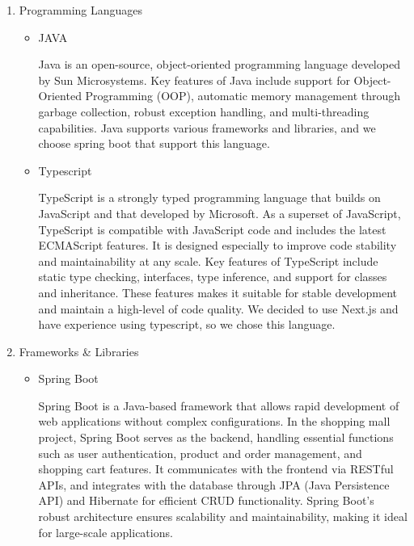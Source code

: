 \documentclass[conference]{IEEEtran}
\begin{document}
\begin{enumerate}
\setlength{\parindent}{2ex}
\setlength{\parskip}{0.5em}
\item Programming Languages

\begin{itemize}
\setlength{\parindent}{2ex}
\setlength{\parskip}{0.5em}
\item JAVA

Java is an open-source, object-oriented programming language developed by Sun Microsystems. Key features of Java include support for Object-Oriented Programming (OOP), automatic memory management through garbage collection, robust exception handling, and multi-threading capabilities. Java supports various frameworks and libraries, and we choose spring boot that support this language.

\item Typescript

TypeScript is a strongly typed programming language that builds on JavaScript and that developed by Microsoft. As a superset of JavaScript, TypeScript is compatible with JavaScript code and includes the latest ECMAScript features. It is designed especially to improve code stability and maintainability at any scale. Key features of TypeScript include static type checking, interfaces, type inference, and support for classes and inheritance. These features makes it suitable for stable development and maintain a high-level of code quality.
We decided to use Next.js and have experience using typescript, so we chose this language.

\end{itemize}

\item Frameworks \& Libraries

\begin{itemize}
\setlength{\parindent}{2ex}
\setlength{\parskip}{0.5em}
\item Spring Boot

Spring Boot is a Java-based framework that allows rapid development of web applications without complex configurations. In the shopping mall project, Spring Boot serves as the backend, handling essential functions such as user authentication, product and order management, and shopping cart features. It communicates with the frontend via RESTful APIs, and integrates with the database through JPA (Java Persistence API) and Hibernate for efficient CRUD functionality. Spring Boot’s robust architecture ensures scalability and maintainability, making it ideal for large-scale applications.


\end{itemize}
\end{enumerate}
\end{document}
